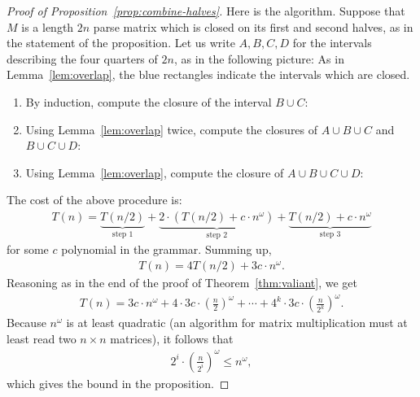 \begin{proof}[Proof of Proposition~\ref{prop:combine-halves}]
	Here is the algorithm. Suppose that $M$ is a length $2n$ parse matrix which is closed on its first and second halves, as in the statement of the proposition. Let us write $A,B,C,D$ for the intervals describing the four quarters of $2n$, as in the following picture: 
As in Lemma~\ref{lem:overlap},	the blue rectangles indicate the intervals which are closed. 
	\begin{enumerate}
	\item By induction,  compute the closure of the interval $B \cup C$:
		\item 	Using Lemma~\ref{lem:overlap} twice,   compute the closures of $A \cup B \cup C$ and  $B \cup C \cup D$:
		\item Using Lemma~\ref{lem:overlap}, compute the closure of $A \cup B \cup C \cup D$:
	\end{enumerate}
The cost of the above procedure is:
\begin{align*}
  T(n) = \underbrace{T(n/2)}_{\text{step 1}} +  \underbrace{2 \cdot (T(n/2) + c \cdot n^\omega)}_{\text{step 2}} + \underbrace{T(n/2) +  c \cdot n^\omega}_{\text{step 3}} 
\end{align*}
for some $c$ polynomial in the grammar. Summing up,
\begin{align*}
T(n) =   4T(n/2) + 3c \cdot n^\omega.
\end{align*}
Reasoning as in the end of the proof of Theorem~\ref{thm:valiant}, we get
\begin{align*}
  T(n) = 3c \cdot n^\omega + 4 \cdot 3c \cdot (\frac n 2)^\omega + \cdots + 4^k \cdot 3c \cdot (\frac n {2^k})^\omega.
\end{align*}	
Because $n^\omega$ is at least quadratic (an algorithm for matrix multiplication must at least read two  $n \times n$ matrices), it follows that 
\begin{align*}
  2^i  \cdot (\frac n {2^i})^\omega \le     n^\omega,
\end{align*}
which gives the bound in the proposition.
\end{proof}

